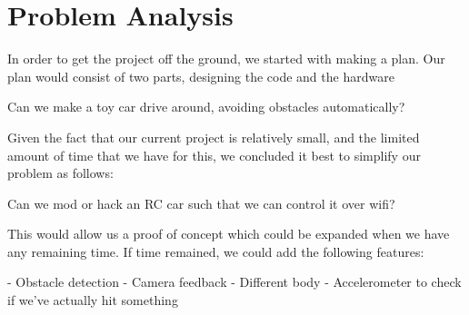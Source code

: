 \section{Problem Analysis}
\par
In order to get the project off the ground, we started with making a plan. Our plan would consist of two parts, designing the code and the hardware

Can we make a toy car drive around, avoiding obstacles automatically?

Given the fact that our current project is relatively small, and the limited amount of time that we have for this, we concluded it best to simplify our problem as follows:

Can we mod or hack an RC car such that we can control it over wifi?



This would allow us a proof of concept which could be expanded when we have any remaining time. If time remained, we could add the following features:

 - Obstacle detection
 - Camera feedback
 - Different body
 - Accelerometer to check if we've actually hit something

